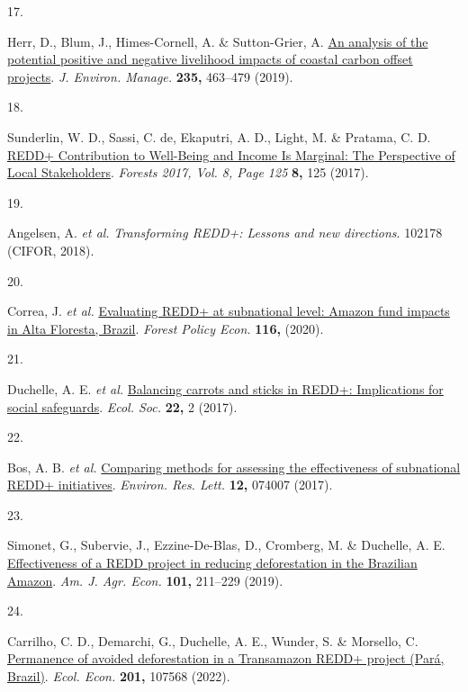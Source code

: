 \documentclass[
]{article}
\newlength{\cslhangindent}
\newlength{\csllabelwidth}
\newlength{\cslentryspacingunit} %
\newenvironment{CSLReferences}[2] %
 {%
  \setlength{\parindent}{0pt}
  \ifodd #1
  \let\oldpar\par
  \def\par{\hangindent=\cslhangindent\oldpar}
  \fi
  \setlength{\parskip}{#2\cslentryspacingunit}
 }%
 {}
\newcommand{\CSLLeftMargin}[1]{\parbox[t]{\csllabelwidth}{#1}}
\newcommand{\CSLRightInline}[1]{\parbox[t]{\linewidth - \csllabelwidth}{#1}\break}
\begin{document}
\begin{CSLReferences}{0}{0}
\leavevmode{}%
\CSLLeftMargin{17. }%
\CSLRightInline{Herr, D., Blum, J., Himes-Cornell, A. \& Sutton-Grier,
A. \href{https://doi.org/10.1016/j.jenvman.2019.01.067}{{An analysis of
the potential positive and negative livelihood impacts of coastal carbon
offset projects}}. \emph{J. Environ. Manage.} \textbf{235,} 463--479
(2019).}

\leavevmode{}%
\CSLLeftMargin{18. }%
\CSLRightInline{Sunderlin, W. D., Sassi, C. de, Ekaputri, A. D., Light,
M. \& Pratama, C. D. \href{https://doi.org/10.3390/F8040125}{{REDD+
Contribution to Well-Being and Income Is Marginal: The Perspective of
Local Stakeholders}}. \emph{Forests 2017, Vol. 8, Page 125} \textbf{8,}
125 (2017).}

\leavevmode{}%
\CSLLeftMargin{19. }%
\CSLRightInline{Angelsen, A. \emph{et al.} \emph{{Transforming REDD+:
Lessons and new directions}}. 102178 (CIFOR, 2018).}

\leavevmode{}%
\CSLLeftMargin{20. }%
\CSLRightInline{Correa, J. \emph{et al.}
\href{https://doi.org/10.1016/j.forpol.2020.102178}{{Evaluating REDD+ at
subnational level: Amazon fund impacts in Alta Floresta, Brazil}}.
\emph{Forest Policy Econ.} \textbf{116,} (2020).}

\leavevmode{}%
\CSLLeftMargin{21. }%
\CSLRightInline{Duchelle, A. E. \emph{et al.}
\href{https://doi.org/10.5751/ES-09334-220302}{{Balancing carrots and
sticks in REDD+: Implications for social safeguards}}. \emph{Ecol. Soc.}
\textbf{22,} 2 (2017).}

\leavevmode{}%
\CSLLeftMargin{22. }%
\CSLRightInline{Bos, A. B. \emph{et al.}
\href{https://doi.org/10.1088/1748-9326/aa7032}{{Comparing methods for
assessing the effectiveness of subnational REDD+ initiatives}}.
\emph{Environ. Res. Lett.} \textbf{12,} 074007 (2017).}

\leavevmode{}%
\CSLLeftMargin{23. }%
\CSLRightInline{Simonet, G., Subervie, J., Ezzine-De-Blas, D., Cromberg,
M. \& Duchelle, A. E.
\href{https://doi.org/10.1093/ajae/aay028}{{Effectiveness of a REDD
project in reducing deforestation in the Brazilian Amazon}}. \emph{Am.
J. Agr. Econ.} \textbf{101,} 211--229 (2019).}

\leavevmode{}%
\CSLLeftMargin{24. }%
\CSLRightInline{Carrilho, C. D., Demarchi, G., Duchelle, A. E., Wunder,
S. \& Morsello, C.
\href{https://doi.org/10.1016/J.ECOLECON.2022.107568}{{Permanence of
avoided deforestation in a Transamazon REDD+ project (Par{á}, Brazil)}}.
\emph{Ecol. Econ.} \textbf{201,} 107568 (2022).}


\end{CSLReferences}
\end{document}
